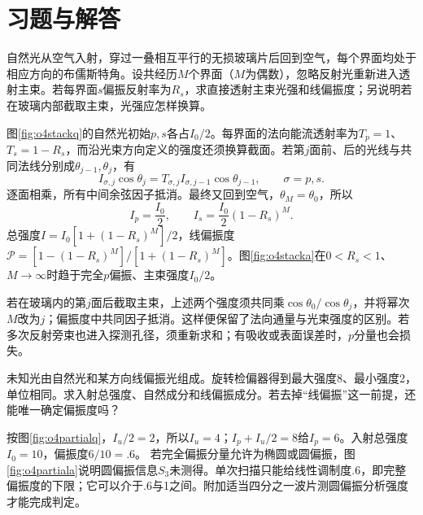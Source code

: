 \section{习题与解答}



\begin{exercise}\label{ex:o4stack}
自然光从空气入射，穿过一叠相互平行的无损玻璃片后回到空气，每个界面均处于相应方向的布儒斯特角。设共经历$M$个界面（$M$为偶数），忽略反射光重新进入透射主束。若每界面$s$偏振反射率为$R_s$，求直接透射主束光强和线偏振度；另说明若在玻璃内部截取主束，光强应怎样换算。
\end{exercise}
\begin{solution}
图\ref{fig:o4stackq}的自然光初始$p,s$各占$I_0/2$。每界面的法向能流透射率为$T_p=1$、$T_s=1-R_s$，而沿光束方向定义的强度还须换算截面。若第$j$面前、后的光线与共同法线分别成$\theta_{j-1},\theta_j$，有
\[
 I_{\sigma,j}\cos\theta_j
 =T_{\sigma,j}I_{\sigma,j-1}\cos\theta_{j-1},
 \qquad \sigma=p,s.
\]
逐面相乘，所有中间余弦因子抵消。最终又回到空气，$\theta_M=\theta_0$，所以
\[
 I_p=\frac{I_0}{2},\qquad
 I_s=\frac{I_0}{2}(1-R_s)^M.
\]
总强度$I=I_0[1+(1-R_s)^M]/2$，线偏振度$\mathcal P=[1-(1-R_s)^M]/[1+(1-R_s)^M]$。图\ref{fig:o4stacka}在$0<R_s<1$、$M\to\infty$时趋于完全$p$偏振、主束强度$I_0/2$。

若在玻璃内的第$j$面后截取主束，上述两个强度须共同乘$\cos\theta_0/\cos\theta_j$，并将幂次$M$改为$j$；偏振度中共同因子抵消。这样便保留了法向通量与光束强度的区别。若多次反射旁束也进入探测孔径，须重新求和；有吸收或表面误差时，$p$分量也会损失。
\end{solution}

\begin{exercise}\label{ex:o4partialmeasure}
未知光由自然光和某方向线偏振光组成。旋转检偏器得到最大强度8、最小强度2，单位相同。求入射总强度、自然成分和线偏振成分。若去掉“线偏振”这一前提，还能唯一确定偏振度吗？
\end{exercise}
\begin{solution}
按图\ref{fig:o4partialq}，$I_u/2=2$，所以$I_u=4$；$I_p+I_u/2=8$给$I_p=6$。入射总强度$I_0=10$，偏振度$6/10=.6$。
若完全偏振分量允许为椭圆或圆偏振，图\ref{fig:o4partiala}说明圆偏振信息$S_3$未测得。单次扫描只能给线性调制度.6，即完整偏振度的下限；它可以介于.6与1之间。附加适当四分之一波片测圆偏振分析强度才能完成判定。
\end{solution}

